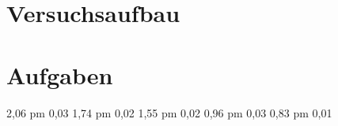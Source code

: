 \section{Versuchsaufbau}

\section{Aufgaben}
2,06 pm 0,03
1,74 pm 0,02
1,55 pm 0,02
0,96 pm 0,03
0,83 pm 0,01


